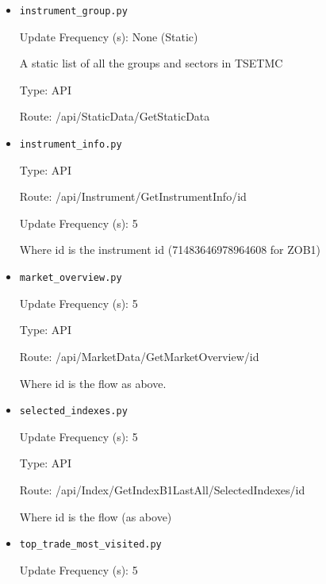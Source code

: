 {\begin{itemize}
	  	Route: /api/Index/GetInstEffect/0/id/constant

	  	Where id is the flow (as above) and constant is the number of rows required (i.e top 5, 10 or 20 ,etc.)


      	\item \texttt{instrument\_group.py}

   		Update Frequency (s): None (Static)

      	A static list of all the groups and sectors in TSETMC

	  	Type: API

 		Route: /api/StaticData/GetStaticData

      	\item \texttt{instrument\_info.py}

	  	Type: API

		Route: /api/Instrument/GetInstrumentInfo/{id}

   		Update Frequency (s): 5

		Where id is the instrument id (71483646978964608 for ZOB1)


      	\item \texttt{market\_overview.py}

   		Update Frequency (s): 5

	  	Type: API

	  	Route: /api/MarketData/GetMarketOverview/{id}

	  	Where id is the flow as above.


      	\item \texttt{selected\_indexes.py}

   		Update Frequency (s): 5

	  	Type: API

	  	Route: /api/Index/GetIndexB1LastAll/SelectedIndexes/id

	  	Where id is the flow (as above)


   		\item \texttt{top\_trade\_most\_visited.py}

   		Update Frequency (s): 5


\end{itemize}}
